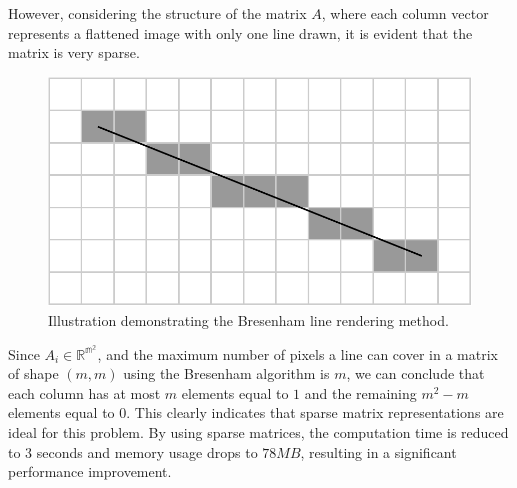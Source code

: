 However, considering the structure of the matrix \(A\), where each column vector represents a flattened image with only one line drawn, it is evident that the matrix is very sparse. 

\begin{figure}[H]
    \centering
    \includegraphics[width=0.33\linewidth]{images/bresenham.pdf}
    \caption{Illustration demonstrating the Bresenham line rendering method.}
    \label{fig:bresenham}
\end{figure}

Since \(A_i \in \mathbb{R^{m^2}}\),  and the maximum number of pixels a line can cover in a matrix of shape \((m, m)\) using the Bresenham algorithm is \(m\), we can conclude that each column has at most \(m\) elements equal to \(1\) and the remaining \(m^2-m\) elements equal to 0. This clearly indicates that sparse matrix representations are ideal for this problem. By using sparse matrices, the computation time is reduced to \(3\) seconds and memory usage drops to \(78MB\), resulting in a significant performance improvement.

